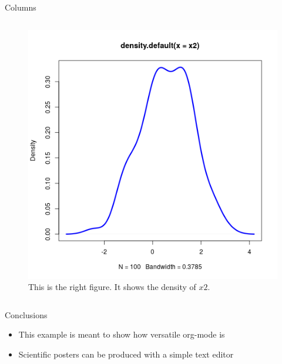 \documentclass[final]{beamer}
\begin{document}
\begin{frame}[fragile,label={sec:org48aedac}]{}
\begin{columns}
\begin{column}[t]{0.45\columnwidth}
\begin{block}{Columns}
\begin{columns}
\begin{column}[T]{0.48\columnwidth}
\captionsetup{justification=justified,width=.85\linewidth}
\begin{figure}[htbp]
\centering
\includegraphics[width=.9\linewidth]{4r.png}
\caption{\label{fig:orgf00fe3b}
This is the right figure. It shows the density of \(x2\).}
\end{figure}
\end{column}
\end{columns}
\end{block}

\begin{block}{Conclusions}
\begin{itemize}
\item This example is meant to show how versatile org-mode is
\item Scientific posters can be produced with a simple text editor
\end{itemize}
\end{block}
\end{column}
\end{columns}
\end{frame}
\end{document}
